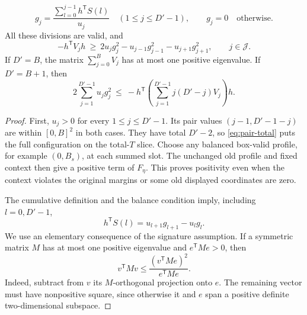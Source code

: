 \begin{lemma}
\begin{equation}
 g_j=\frac{\sum_{l=0}^{j-1}h^{\mathsf T}S(l)}{u_j}
       \quad(1\le j\le D'-1),\qquad
 g_j=0\quad\text{otherwise}.
\end{equation}
All these divisions are valid, and
\begin{equation}\label{eq:pair-one}
 -h^{\mathsf T}V_jh\ \ge\
 2u_jg_j^2-u_{j-1}g_{j-1}^2-u_{j+1}g_{j+1}^2,
 \qquad j\in\mathcal J.
\end{equation}
If $D'=B$, the matrix $\sum_{j=0}^B V_j$ has at most one positive
eigenvalue.
If $D'=B+1$, then
\begin{equation}\label{eq:pair-weighted}
 2\sum_{j=1}^{D'-1}u_jg_j^2
 \ \le\
 -h^{\mathsf T}\left(\sum_{j=1}^{D'-1}j(D'-j)V_j\right)h.
\end{equation}
\end{lemma}
\begin{proof}
First, $u_j>0$ for every $1\le j\le D'-1$.  Its pair values
$(j-1,D'-1-j)$ are within $[0,B]^2$ in both cases.  They have total
$D'-2$, so \eqref{eq:pair-total} puts the full configuration on the
total-$T$ slice.  Choose any balanced box-valid profile, for example
$(0,B_s)$, at each summed slot.  The unchanged old profile and fixed
context then give a positive term of $F_\eta$.  This proves positivity
even when the context violates the original margins or some old
displayed coordinates are zero.

The cumulative definition and the balance condition imply, including
$l=0,D'-1$,
\begin{equation}\label{eq:pair-difference}
 h^{\mathsf T}S(l)=u_{l+1}g_{l+1}-u_lg_l.
\end{equation}
We use an elementary consequence of the signature assumption.  If a
symmetric matrix $M$ has at most one positive eigenvalue and
$e^{\mathsf T}Me>0$, then
\begin{equation}\label{eq:positive-projection}
 v^{\mathsf T}Mv\le
       \frac{(v^{\mathsf T}Me)^2}{e^{\mathsf T}Me}.
\end{equation}
Indeed, subtract from $v$ its $M$-orthogonal projection onto $e$.
The remaining vector must have nonpositive square, since otherwise it
and $e$ span a positive definite two-dimensional subspace.


\end{proof}
